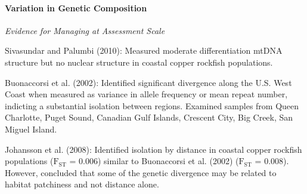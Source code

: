 \documentclass[11pt,
  english,
  a4paper,
]{article}
\begin{document}
\hypertarget{variation-in-genetic-composition}{%
\paragraph{Variation in Genetic Composition}\label{variation-in-genetic-composition}}

\leavevmode\tagmcend\tagstructend


\emph{Evidence for Managing at Assessment Scale}

\leavevmode\tagmcend\tagstructend\par


Sivasundar and Palumbi {(2010)\leavevmode\tagmcend\tagstructend}: Measured moderate differentiation mtDNA structure but no nuclear structure in coastal copper rockfish populations.

\leavevmode\tagmcend\tagstructend\par


Buonaccorsi et al. {(2002)\leavevmode\tagmcend\tagstructend}: Identified significant divergence along the U.S. West Coast when measured as variance in allele frequency or mean repeat number, indicting a substantial isolation between regions. Examined samples from Queen Charlotte, Puget Sound, Canadian Gulf Islands, Crescent City, Big Creek, San Miguel Island.

\leavevmode\tagmcend\tagstructend\par


Johansson et al. {(2008)\leavevmode\tagmcend\tagstructend}: Identified isolation by distance in coastal copper rockfish populations ({\(\text{F}_\text{ST}\)\leavevmode\tagmcend\tagstructend} = 0.006) similar to Buonaccorsi et al. {(2002)\leavevmode\tagmcend\tagstructend} ({\(\text{F}_\text{ST}\)\leavevmode\tagmcend\tagstructend} = 0.008). However, concluded that some of the genetic divergence may be related to habitat patchiness and not distance alone.
\end{document}
